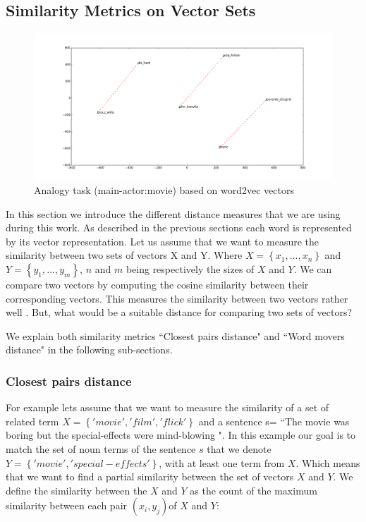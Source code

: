 \documentclass{article}
\begin{document}
\subsection{Similarity Metrics on Vector Sets}
\begin{figure}
 \begin{center}
 \includegraphics[scale=0.3]{tsne_analogies2.png} 
 \caption{ Analogy task (main-actor:movie) based on word2vec vectors  } 
  \label{analogytask}
  \end{center}
 \end{figure}
In this section we introduce the different distance measures that we are using during this work. As described in the previous sections each word is represented by its vector representation.
Let us assume that we want to measure the similarity between two sets of vectors X and Y. Where 
$X=\left \{ x_{1}, ... , x_{n} \right \}$ and $Y= \left \{ y_{1}, ... , y_{m} \right \}$,  $n$ and $m$ being respectively the sizes of $X$ and $Y$.
We can compare two vectors by computing the cosine similarity between their corresponding vectors. This measures the similarity between two vectors rather well \cite{manning:1999}. But, what would be a suitable distance for comparing two sets of vectors? 

We explain both similarity metrics ``Closest pairs distance" and ``Word movers distance" in the following sub-sections. 
\subsubsection{Closest pairs distance}
For example lets assume that we want to measure the similarity of a set of related term $X=\left \{'movie', 'film','flick'\right \}$ and a sentence s= ``The movie was boring but the special-effects were mind-blowing ". 
In this example our goal is to match the set of noun terms of the sentence $s$ that we denote $Y= \left \{ 'movie', 'special-effects'\right \}$, with at least one term from $X$.
Which means that we want to find a partial similarity between  the set of vectors $X$ and $Y$.
We define the similarity between the $X$ and $Y$ as the count of the maximum similarity between each pair $(x_{i}, y_{j})$of $X$ and $Y$: 
\end{document}
